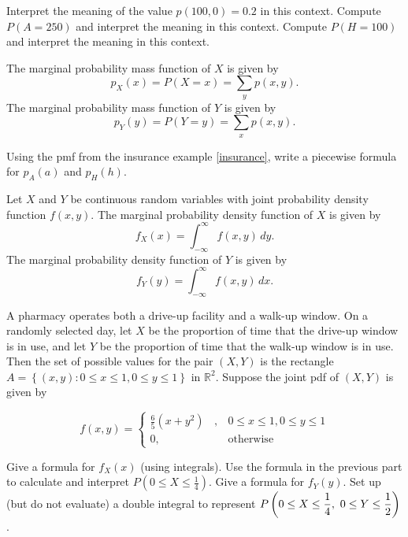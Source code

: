 \bb
\ii Interpret the meaning of the value $p(100,0)=0.2$ in this context. \vfill
\ii Compute $P(A=250)$ and interpret the meaning in this context. \vfill
\ii Compute $P(H=100)$ and interpret the meaning in this context. \vfill
\ee
\ee

\bbox
\bi
\ii The \alert{marginal probability mass function} of $X$ is given by
\[ p_X(x) = P(X=x) = \sum_y p(x,y). \]
\ii The \alert{marginal probability mass function} of $Y$ is given by
\[ p_Y(y) = P(Y=y) = \sum_x p(x,y). \]
\ei
\ebox

\bb[resume]
\ii Using the pmf from the insurance example \ref{insurance}, write a piecewise formula for $p_A(a)$ and $p_H(h)$. \vfill
\ee

\clearpage


\bbox
Let $X$ and $Y$ be continuous random variables with \alert{joint probability density function} \newline $f(x,y)$.
\bi
\ii The \alert{marginal probability density function} of $X$ is given by
\[ f_X(x) = \int_{-\infty}^{\infty} f(x,y) \, dy. \]
\ii The \alert{marginal probability density function} of $Y$ is given by
\[ f_Y(y) = \int_{-\infty}^{\infty} f(x,y) \, dx. \]
\ei
\ebox


\bb[resume]
\ii A pharmacy operates both a drive-up facility and a walk-up window. On a randomly selected day, let
$X$ be the proportion of time that the drive-up window is in use,
and let $Y$ be the proportion of time that the walk-up window is in use.
Then the set of possible values for the pair $(X, Y)$ is the rectangle $A= \left\{ (x, y): 0 \leq x \leq 1, 0 \leq y \leq 1 \right\}$ in
$\mathbb{R}^2$. Suppose the joint pdf of $(X,Y)$ is given by\label{pharm}

\[ f(x,y) = \left\{ \begin{array}{ll}
\frac{6}{5}(x+y^2) \ \ \ \ , & 0 \leq x \leq 1, 0 \leq y \leq 1\\
0 , & \mbox{otherwise}
\end{array} \right. \]

\bb
\ii Give a formula for $f_X(x)$ (using integrals). \vfill
\ii Use the formula in the previous part to calculate and interpret $P( 0 \leq X \leq \frac{1}{4})$. \vfill
\ii Give a formula for $f_Y(y)$.  \vfill
\ii Set up (but do not evaluate) a double integral to represent $\displaystyle P \left( 0 \leq X \leq \frac{1}{4} , \ 0 \leq Y \leq \frac{1}{2} \right)$. \vspace{0.5in}
\ee
\ee

